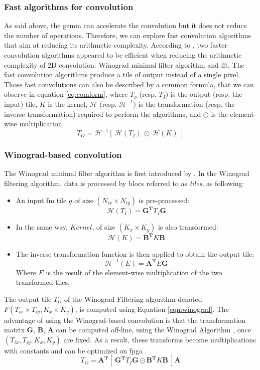 \subsubsection{Fast algorithms for convolution}
%
%
As said above, the \acrshort{gemm} can accelerate the convolution but it does not reduce the number of operations. Therefore, we can explore fast convolution algorithms that aim at reducing its arithmetic complexity. According to \textcite{liang_evaluating_2020}, two faster convolution algorithms appeared to be efficient when reducing the arithmetic complexity of 2D convolution: Winograd minimal filter algorithm and \acrfull{fft}. The fast convolution algorithms produce a tile of output instead of a single pixel. Those fast convolutions can also be described by a common formula, that we can observe in equation \ref{eq:comform}, where $T_o$ (resp. $T_I$) is the output (resp. the input) tile, $K$ is the kernel, $\mathcal{H}$ (resp. $\mathcal{H}^{-1}$) is the transformation (resp. the inverse transformation) required to perform the algorithms, and $\odot$ is the element-wise multiplication.
%
\begin{equation}
    T_O = \mathcal{H}^{-1} [ \ \mathcal{H}(T_I) \ \odot \ \mathcal{H}(K) \ ]
    \label{eq:comform}
\end{equation}
%
\subsubsection{Winograd-based convolution}
%
The Winograd minimal filter algorithm is first introduced by \cite{winograd_arithmetic_1980}. In the Winograd filtering algorithm, data is processed by blocs referred to as \textit{tiles}, as following:
\begin{itemize}
    \item An input \acrshort{fm} tile $g$ of size $(N_{ix} \times N_{iy})$ is pre-processed: $$\mathcal{H}(T_I) = \boldsymbol{G^{T}} T_I \boldsymbol{G} $$
    \item In the same way, $Kernel$, of size $(K_x \times K_y)$ is also transformed: $$\mathcal{H}(K) = \boldsymbol{B^{T}} K \boldsymbol{B}$$
    \item The inverse transformation function is then applied to obtain the output tile: $$\mathcal{H}^{-1}(E) = \boldsymbol{A^{T}} E \boldsymbol{G}$$ Where $E$ is the result of the element-wise multiplication of the two transformed tiles.
\end{itemize}
The output tile $T_O$ of the Winograd Filtering algorithm denoted $F(T_{ix} \times T_{iy}, K_x \times K_y)$, is computed using Equation \eqref{eqn:winograd}. The advantage of using the Winograd-based convolution is that the transformation matrix $\boldsymbol{G}$, $\boldsymbol{B}$, $\boldsymbol{A}$ can be computed off-line, using the Winograd Algorithm \cite{winograd_arithmetic_1980}, once $(T_{ix}, T_{iy}, K_x, K_y)$ are fixed. As a result, these transforms become multiplications with constants and can be optimized on \acrshort{fpga} \cite{liang_evaluating_2020}.
%
\begin{equation}
    T_O = \boldsymbol{A^{T}} [ \ \boldsymbol{G^{T}} T_I \boldsymbol{G} \odot \boldsymbol{B^{T}} K\boldsymbol{B} \ ] \boldsymbol{A}
    \label{eqn:winograd}
\end{equation}

